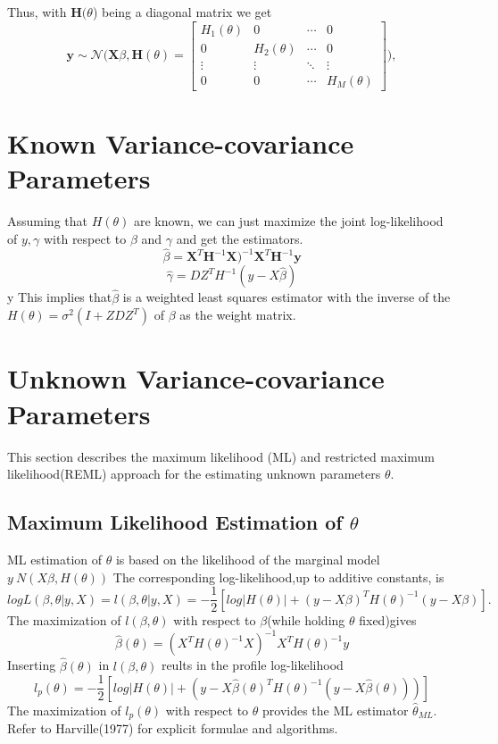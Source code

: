 \documentclass[a4paper,11pt]{article}
\begin{document}
Thus, with $\bm{H}(\theta$) being a diagonal matrix we get \begin{equation}
	\bm{y}\sim\mathcal{N}\biggl( \bm{X}\beta,\bm{H}(\theta)= \left[ \begin{array}{cccc}
	H_1(\theta) & 0 & \cdots & 0 \\
	0 & H_2(\theta)& \cdots& 0 \\
	\vdots & \vdots & \ddots& \vdots\\
	0 & 0& \cdots & H_M(\theta) \end{array} \right] \biggr),	
\end{equation}
\section{Known Variance-covariance Parameters}
Assuming that $H(\theta)$ are known, we can just maximize the joint log-likelihood of $y,\gamma$ with respect to $\beta$ and $\gamma$ and get the estimators.
\begin{equation}
\widehat{\beta}=\bm{X}^T\bm{H}^{-1}\bm{X})^{-1}\bm{X}^T\bm{H}^{-1}\bm{y}
\end{equation}
\begin{equation}
\widehat{\gamma}= DZ^TH^{-1}(y-X\widehat{\beta})
\end{equation}y
This implies that$\widehat{\beta}$ is a weighted least squares estimator with the inverse of the $H(\theta) = \sigma^2(I+ZDZ^T)$ of $\beta$ as the weight matrix.
\section{Unknown Variance-covariance Parameters}
This section describes the maximum likelihood (ML) and restricted maximum likelihood(REML) approach for the estimating unknown parameters $\theta$.
\subsection{Maximum Likelihood Estimation of $\theta$}
ML estimation of $\theta$ is based on the likelihood of the marginal model $y ~ N(X\beta,H(\theta))$
The corresponding log-likelihood,up to additive constants, is
\begin{equation}
log L(\beta,\theta|y,X) =l(\beta,\theta|y,X) = - \frac{1}{2}[log|H(\theta)| + (y - X\beta)^TH(\theta)^{-1}(y - X\beta)].
\end{equation}
The maximization of $l(\beta,\theta)$ with respect to $\beta$(while holding $\theta$ fixed)gives
\begin{equation}
\widehat \beta (\theta) = (X^TH(\theta)^{-1}X)^{-1}X^TH(\theta)^{-1}y
\end{equation}
Inserting $\widehat \beta (\theta)$ in $l(\beta,\theta)$ reults in the profile log-likelihood
\begin{equation}
l_p(\theta) = -\frac{1}{2}[log|H(\theta)| + (y-X\widehat\beta(\theta)^TH(\theta)^{-1}(y - X\widehat\beta(\theta)))]
\end{equation}
The maximization of $l_p(\theta)$ with respect to $\theta$ provides the ML estimator $\widehat\theta_{ML}$.
Refer to Harville(1977) for explicit formulae and algorithms.
\end{document}
